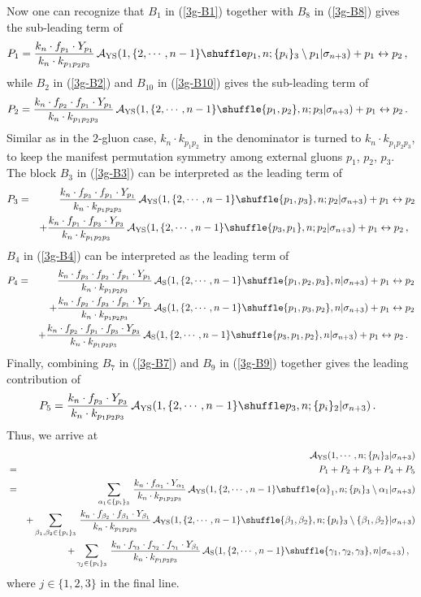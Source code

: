 \documentclass[preprint,showpacs,onecolumn,nofootinbib]{revtex4}
\newcommand{\bea}{\begin{eqnarray}}
\newcommand{\eea}{\end{eqnarray}}
\newcommand{\nn}{\nonumber \\}
\def\eref#1{(\ref{#1})}
\def\a{{\alpha}}
\def\b{{\beta}}
\begin{document}
Now one can recognize that $B_1$ in \eref{3g-B1} together with $B_8$ in \eref{3g-B8} gives the sub-leading term of
%
\bea
P_1={k_n\cdot f_{p_1}\cdot Y_{p_1}\over k_n\cdot k_{p_1p_2p_3}}\,{\cal A}_{\rm YS}(1,\{2,\cdots,n-1\}\shuffle p_1,n;\{p_i\}_3\setminus p_1|\sigma_{n+3})+p_1\leftrightarrow p_2\,,~~\label{3g-P1}
\eea
%
while $B_2$ in \eref{3g-B2} and $B_{10}$ in \eref{3g-B10} gives the sub-leading term of
%
\bea
P_2={k_n\cdot f_{p_2}\cdot f_{p_1}\cdot Y_{p_1}\over k_n\cdot k_{p_1p_2p_3}}\,{\cal A}_{\rm YS}(1,\{2,\cdots,n-1\}\shuffle \{p_1,p_2\},n;p_3|\sigma_{n+3})+p_1\leftrightarrow p_2\,.~~\label{3g-P2}
\eea
%
Similar as in the $2$-gluon case, $k_n\cdot k_{p_1p_2}$ in the denominator is turned to $k_{n}\cdot k_{p_1p_2p_3}$, to keep the manifest permutation symmetry among external gluons $p_1$, $p_2$, $p_3$. The block $B_3$ in \eref{3g-B3} can be interpreted as the leading term of
%
\bea
P_3&=&{k_n\cdot f_{p_3}\cdot f_{p_1}\cdot Y_{p_1}\over k_n\cdot k_{p_1p_2p_3}}\,{\cal A}_{\rm YS}(1,\{2,\cdots,n-1\}\shuffle \{p_1,p_3\},n;p_2|\sigma_{n+3})+p_1\leftrightarrow p_2\nn
& &+{k_n\cdot f_{p_1}\cdot f_{p_3}\cdot Y_{p_3}\over k_n\cdot k_{p_1p_2p_3}}\,{\cal A}_{\rm YS}(1,\{2,\cdots,n-1\}\shuffle \{p_3,p_1\},n;p_2|\sigma_{n+3})+p_1\leftrightarrow p_2\,,~~\label{3g-B3}
\eea
%
$B_4$ in \eref{3g-B4} can be interpreted as the leading term of
%
\bea
P_4&=&{k_n\cdot f_{p_3}\cdot f_{p_2}\cdot f_{p_1}\cdot Y_{p_1}\over k_n\cdot k_{p_1p_2p_3}}\,{\cal A}_{\rm S}(1,\{2,\cdots,n-1\}\shuffle \{p_1,p_2,p_3\},n|\sigma_{n+3})+p_1\leftrightarrow p_2\nn
& &+{k_n\cdot f_{p_2}\cdot f_{p_3}\cdot f_{p_1}\cdot Y_{p_1}\over k_n\cdot k_{p_1p_2p_3}}\,{\cal A}_{\rm S}(1,\{2,\cdots,n-1\}\shuffle \{p_1,p_3,p_2\},n|\sigma_{n+3})+p_1\leftrightarrow p_2\nn
& &+{k_n\cdot f_{p_2}\cdot f_{p_1}\cdot f_{p_3}\cdot Y_{p_3}\over k_n\cdot k_{p_1p_2p_3}}\,{\cal A}_{\rm S}(1,\{2,\cdots,n-1\}\shuffle \{p_3,p_1,p_2\},n|\sigma_{n+3})+p_1\leftrightarrow p_2\,.~~\label{3g-P4}
\eea
%
Finally, combining $B_7$ in \eref{3g-B7} and $B_9$ in \eref{3g-B9} together gives the leading contribution of
%
\bea
P_5={k_n\cdot f_{p_3}\cdot Y_{p_3}\over k_n\cdot k_{p_1p_2p_3}}\,{\cal A}_{\rm YS}(1,\{2,\cdots,n-1\}\shuffle p_3,n;\{p_i\}_2|\sigma_{n+3})\,.~~\label{3g-P5}
\eea
%
Thus, we arrive at
%
\bea
& &{\cal A}_{\rm YS}(1,\cdots,n;\{p_i\}_3|\sigma_{n+3})\nn
&=&P_1+P_2+P_3+P_4+P_5\nn
&=&\sum_{\a_1\in\{p_i\}_3}\,{k_n\cdot f_{\a_1}\cdot Y_{\a_1}\over k_n\cdot k_{p_1p_2p_3}}\,{\cal A}_{\rm YS}(1,\{2,\cdots,n-1\}\shuffle \a_1,n;\{p_i\}_3\setminus\a_1|\sigma_{n+3})\nn
& &+\sum_{\b_1,\b_2\in\{p_i\}_3}\,{k_n\cdot f_{\b_2}\cdot f_{\b_1}\cdot Y_{\b_1}\over k_n\cdot k_{p_1p_2p_3}}\,{\cal A}_{\rm YS}(1,\{2,\cdots,n-1\}\shuffle \{\b_1,\b_2\},n;\{p_i\}_3\setminus\{\b_1,\b_2\}|\sigma_{n+3})\nn
& &+\sum_{\gamma_j\in\{p_i\}_3}\,{k_n\cdot f_{\gamma_3}\cdot f_{\gamma_2}\cdot f_{\gamma_1}\cdot Y_{\b_1}\over k_n\cdot k_{p_1p_2p_3}}\,{\cal A}_{\rm S}(1,\{2,\cdots,n-1\}\shuffle \{\gamma_1,\gamma_2,\gamma_3\},n|\sigma_{n+3})\,,~~\label{expan-3g-gi}
\eea
%
where $j\in\{1,2,3\}$ in the final line.
\end{document}
